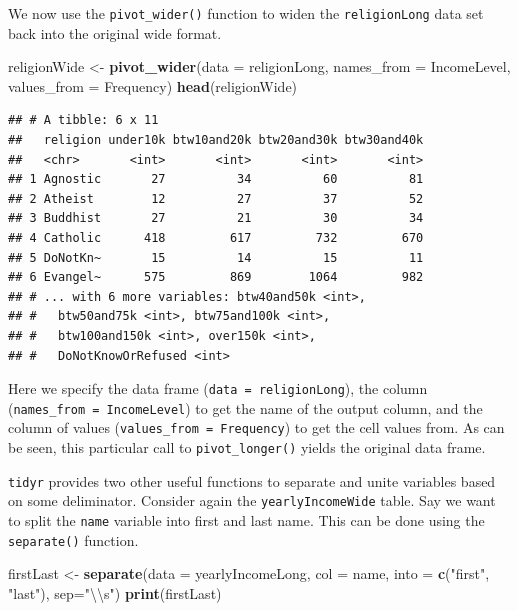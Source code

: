 \documentclass[
]{krantz}
\newenvironment{Shaded}{\begin{snugshade}}{\end{snugshade}}
\newcommand{\CharTok}[1]{\textcolor[rgb]{0.31,0.60,0.02}{#1}}
\newcommand{\DataTypeTok}[1]{\textcolor[rgb]{0.13,0.29,0.53}{#1}}
\newcommand{\KeywordTok}[1]{\textcolor[rgb]{0.13,0.29,0.53}{\textbf{#1}}}
\newcommand{\NormalTok}[1]{#1}
\newcommand{\StringTok}[1]{\textcolor[rgb]{0.31,0.60,0.02}{#1}}
\begin{document}
We now use the \texttt{pivot\_wider()} function to widen the \texttt{religionLong} data set back into the original wide format.

\begin{Shaded}
\begin{Highlighting}[]
\NormalTok{religionWide \textless{}{-}}\StringTok{ }\KeywordTok{pivot\_wider}\NormalTok{(}\DataTypeTok{data =}\NormalTok{ religionLong, }
                \DataTypeTok{names\_from =}\NormalTok{ IncomeLevel, }
                \DataTypeTok{values\_from =}\NormalTok{ Frequency)}
\KeywordTok{head}\NormalTok{(religionWide)}
\end{Highlighting}
\end{Shaded}

\begin{verbatim}
## # A tibble: 6 x 11
##   religion under10k btw10and20k btw20and30k btw30and40k
##   <chr>       <int>       <int>       <int>       <int>
## 1 Agnostic       27          34          60          81
## 2 Atheist        12          27          37          52
## 3 Buddhist       27          21          30          34
## 4 Catholic      418         617         732         670
## 5 DoNotKn~       15          14          15          11
## 6 Evangel~      575         869        1064         982
## # ... with 6 more variables: btw40and50k <int>,
## #   btw50and75k <int>, btw75and100k <int>,
## #   btw100and150k <int>, over150k <int>,
## #   DoNotKnowOrRefused <int>
\end{verbatim}

Here we specify the data frame (\texttt{data\ =\ religionLong}), the column (\texttt{names\_from\ =\ IncomeLevel}) to get the name of the output column, and the column of values (\texttt{values\_from\ =\ Frequency}) to get the cell values from. As can be seen, this particular call to \texttt{pivot\_longer()} yields the original data frame.

\texttt{tidyr} provides two other useful functions to separate and unite variables based on some deliminator. Consider again the \texttt{yearlyIncomeWide} table. Say we want to split the \texttt{name} variable into first and last name. This can be done using the \texttt{separate()} function.

\begin{Shaded}
\begin{Highlighting}[]
\NormalTok{firstLast \textless{}{-}}\StringTok{ }\KeywordTok{separate}\NormalTok{(}\DataTypeTok{data =}\NormalTok{ yearlyIncomeLong, }\DataTypeTok{col =}\NormalTok{ name, }
                      \DataTypeTok{into =} \KeywordTok{c}\NormalTok{(}\StringTok{"first"}\NormalTok{, }\StringTok{"last"}\NormalTok{), }\DataTypeTok{sep=}\StringTok{"}\CharTok{\textbackslash{}\textbackslash{}}\StringTok{s"}\NormalTok{)}
\KeywordTok{print}\NormalTok{(firstLast)}
\end{Highlighting}
\end{Shaded}
\end{document}
